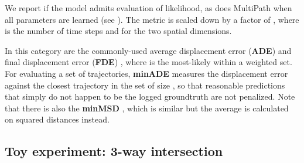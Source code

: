 \documentclass{article}
\newcommand{\out}[1]{}
\newcommand{\multiflow}{MultiPath\xspace}
\begin{document}
 We report  if the model admits evaluation of likelihood, as does \multiflow when all parameters are learned (see ). The metric is scaled down by a factor of , where  is the number of time steps and  for the two spatial dimensions.


\out{The log-likelihood is a concise \TODO{chaiy, how to phrase this better} metric compared to the distance-based metrics which often over-penalizes reasonable trajectories that could have happened but did not in the dataset. However, the log-likelihood is less }

\out{\TODO{Do it if time allows.} For methods that generate one or a few discrete trajectories without estimating covariances, we find a single scalar  to represent variances at all waypoints. We assume independence between and within waypoints. For generative methods where a large number of independent samples can be drawn, we apply kernel-density-estimation (KDE) on the samples to yield a mixture of Gaussian, which in turn estimates the log-likelihood of a groundtruth trajectory. The log-likelihood is our {\em preferred} metric for the ablation. Unfortunately, the log-likelihood approximated via post-processing may suffer from great approximation error and become less comparable. The log-likelihood has the unit in nat.
}

 In this category are the commonly-used average displacement error ({\bf ADE})  and final displacement error ({\bf FDE}) ,  where  is the most-likely within a weighted set. For evaluating a set of trajectories, {\bf minADE}  measures the displacement error against the closest trajectory in the set of size , so that reasonable predictions that simply do not happen to be the logged groundtruth are not penalized. Note that there is also the {\bf minMSD} \cite{Rhinehart18}, which is similar but the average is calculated on squared distances instead.



\subsection{Toy experiment: 3-way intersection}
\label{sec:toy}
\end{document}
